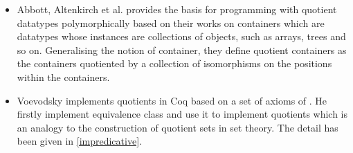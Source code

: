 \begin{itemize}
\item Abbott, Altenkirch et al. \cite{abb:04} provides the basis for
programming with quotient datatypes polymorphically based on their
works on containers which are datatypes whose instances are
collections of objects, such as arrays, trees and so on. Generalising
the notion of container, they define quotient containers as the
containers quotiented by a collection of isomorphisms on the positions
within the containers.

\item Voevodsky \cite{voe:hset} implements quotients in Coq based on a set
of axioms of \hott. He firstly implement
equivalence class and use it to implement quotients which is an
analogy to the construction of quotient sets in set theory. The detail has been given in \autoref{impredicative}.

\end{itemize}



